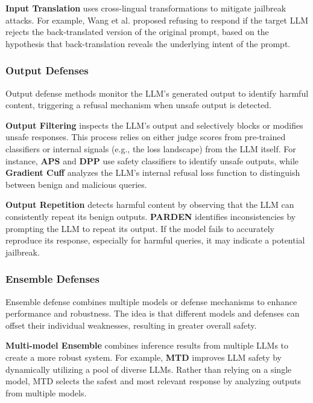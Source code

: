 \textbf{Input Translation} uses cross-lingual transformations to mitigate jailbreak attacks. For example, Wang et al. \cite{wang2024defending} proposed refusing to respond if the target LLM rejects the back-translated version of the original prompt, based on the hypothesis that back-translation reveals the underlying intent of the prompt.

\subsubsection{Output Defenses}

Output defense methods monitor the LLM’s generated output to identify harmful content, triggering a refusal mechanism when unsafe output is detected.

\textbf{Output Filtering} inspects the LLM's output and selectively blocks or modifies unsafe responses. This process relies on either judge scores from pre-trained classifiers or internal signals (e.g., the loss landscape) from the LLM itself. For instance, \textbf{APS} \cite{kim2023robust} and \textbf{DPP} \cite{xiong2024defensive} use safety classifiers to identify unsafe outputs, while \textbf{Gradient Cuff} \cite{hu2024gradient} analyzes the LLM’s internal refusal loss function to distinguish between benign and malicious queries.

\textbf{Output Repetition} detects harmful content by observing that the LLM can consistently repeat its benign outputs. \textbf{PARDEN} \cite{zhang2024parden} identifies inconsistencies by prompting the LLM to repeat its output. If the model fails to accurately reproduce its response, especially for harmful queries, it may indicate a potential jailbreak.

\subsubsection{Ensemble Defenses}

Ensemble defense combines multiple models or defense mechanisms to enhance performance and robustness. The idea is that different models and defenses can offset their individual weaknesses, resulting in greater overall safety.

\textbf{Multi-model Ensemble} combines inference results from multiple LLMs to create a more robust system. For example, \textbf{MTD} \cite{chen2023jailbreaker} improves LLM safety by dynamically utilizing a pool of diverse LLMs. Rather than relying on a single model, MTD selects the safest and most relevant response by analyzing outputs from multiple models.

